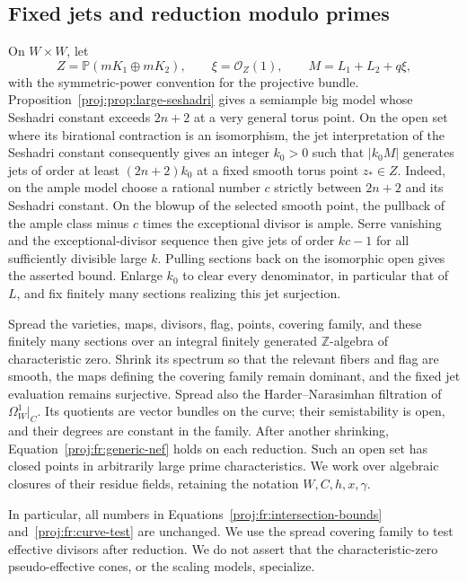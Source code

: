 \documentclass[11pt,letterpaper]{article}
\newcommand{\Z}{\mathbb{Z}}
\newcommand{\PP}{\mathbb{P}}
\newcommand{\OO}{\mathcal{O}}
\theoremstyle{definition}
\theoremstyle{remark}
\begin{document}
\subsection{Fixed jets and reduction modulo primes}

On \(W\times W\), let
\[
 Z=\PP(mK_1\oplus mK_2),\qquad
 \xi=\OO_Z(1),\qquad
 M=L_1+L_2+q\xi,
\]
with the symmetric-power convention for the projective bundle.
Proposition~\ref{proj:prop:large-seshadri} gives a semiample big model whose
Seshadri constant exceeds \(2n+2\) at a very general torus point.
On the open set where its birational contraction is an isomorphism,
the jet interpretation of the Seshadri constant consequently gives
an integer \(k_0>0\) such that \(|k_0M|\) generates jets of order
at least \((2n+2)k_0\) at a fixed smooth torus point \(z_*\in Z\).
Indeed, on the ample model choose a rational number \(c\) strictly
between \(2n+2\) and its Seshadri constant. On the blowup of the
selected smooth point, the pullback of the ample class minus \(c\)
times the exceptional divisor is ample. Serre vanishing and the
exceptional-divisor sequence then give jets of order \(kc-1\) for
all sufficiently divisible large \(k\). Pulling sections back on the
isomorphic open gives the asserted bound.
Enlarge \(k_0\) to clear every denominator, in particular that of \(L\),
and fix finitely many sections realizing this jet surjection.

Spread the varieties, maps, divisors, flag, points, covering family,
and these finitely many sections over an integral finitely generated
\(\Z\)-algebra of characteristic zero. Shrink its spectrum so that the
relevant fibers and flag are smooth, the maps defining the covering
family remain dominant, and the fixed jet evaluation remains
surjective. Spread also the Harder--Narasimhan filtration of
\(\Omega_W^1|_C\). Its quotients are vector bundles on the curve; their
semistability is open, and their degrees are constant in the family.
After another shrinking, Equation~\eqref{proj:fr:generic-nef} holds on each
reduction. Such an open set has closed points in arbitrarily large
prime characteristics. We work over algebraic closures of their
residue fields, retaining the notation \(W,C,h,x,\gamma\).

In particular, all numbers in
Equations~\eqref{proj:fr:intersection-bounds} and~\eqref{proj:fr:curve-test}
are unchanged. We use the spread covering family to test effective
divisors after reduction. We do not assert that the characteristic-zero
pseudo-effective cones, or the scaling models, specialize.
\end{document}
